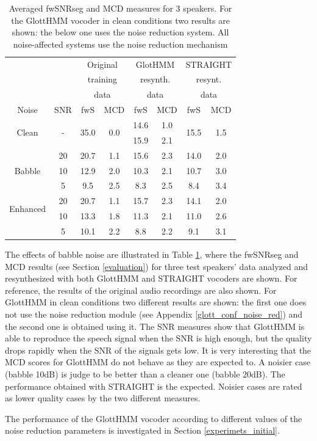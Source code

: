 \begin{table}[!htb]
\begin{centering}
\begin{tabular}{c c|c c|c c|c c}
	 & & \multicolumn{2}{c|}{Original} & \multicolumn{2}{c|}{GlotHMM} & \multicolumn{2}{c}{STRAIGHT}\\
	 & & \multicolumn{2}{c|}{training} & \multicolumn{2}{c|}{resynth.} & \multicolumn{2}{c}{resynt.}\\
	 & & \multicolumn{2}{c|}{data} & \multicolumn{2}{c|}{data} & \multicolumn{2}{c}{data}\\
	Noise & SNR & fwS & MCD & fwS & MCD & fwS & MCD\\
	\midrule
	\midrule
	\multirow{2}{*}{Clean} & \multirow{2}{*}{-} & \multirow{2}{*}{35.0} & \multirow{2}{*}{0.0} & 14.6 & 1.0 & \multirow{2}{*}{15.5} & \multirow{2}{*}{1.5}\\
	 & & & & 15.9 & 2.1 & & \\	
	\midrule
	\multirow{3}{*}{Babble} & 20 & 20.7 & 1.1 & 15.6 & 2.3 & 14.0 & 2.0\\
	 & 10 & 12.9 & 2.0 & 10.3 & 2.1 & 10.7 & 3.0\\
	 & 5 & 9.5 & 2.5 & 8.3 & 2.5 & 8.4 & 3.4\\
	\midrule
	\midrule
	\multirow{2}{*}{Enhanced} & 20 & 20.7 & 1.1 & 15.7 & 2.3 & 14.1 & 2.0\\
	\multirow{2}{*}{Babble} & 10 & 13.3 & 1.8 & 11.3 & 2.1 & 11.0 & 2.6\\
	 & 5 & 10.1 & 2.2 & 8.8 & 2.2 & 9.1 & 3.1\\
	\bottomrule
\end{tabular}
\caption{Averaged fwSNRseg and MCD measures for 3 speakers. For the GlottHMM vocoder in clean conditions two results are shown: the below one uses the noise reduction system. All noise-affected systems use the noise reduction mechanism}
\label{table:an_resyn_results}
\end{centering}
\end{table}

The effects of babble noise are illustrated in Table \ref{table:an_resyn_results}, where the fwSNRseg and MCD results (see Section \ref{evaluation}) for three test speakers' data analyzed and resynthesized with both GlottHMM and STRAIGHT vocoders are shown.
%
For reference, the results of the original audio recordings are also shown.
%
For GlottHMM in clean conditions two different results are shown: the first one does not use the noise reduction module (see Appendix \ref{glott_conf_noise_red}) and the second one is obtained using it.
%
The SNR measures show that GlottHMM is able to reproduce the speech signal when the SNR is high enough, but the quality drops rapidly when the SNR of the signals gets low.
%
It is very interesting that the MCD scores for GlottHMM do not behave as they are expected to.
%
A noisier case (babble 10dB) is judge to be better than a cleaner one (babble 20dB).
%
The performance obtained with STRAIGHT is the expected.
%
Noisier cases are rated as lower quality cases by the two different measures.

The performance of the GlottHMM vocoder according to different values of the noise reduction parameters is investigated in Section \ref{experimets_initial}.
